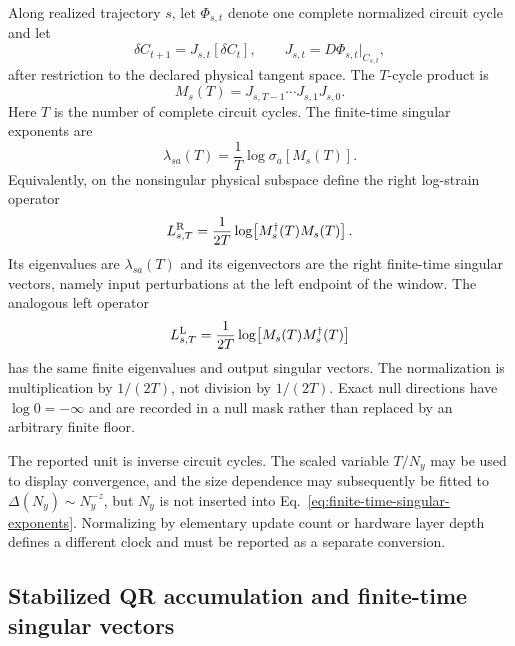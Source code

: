 \documentclass[aps,prx,twocolumn,floatfix,nofootinbib,superscriptaddress,longbibliography]{revtex4-2}
\begin{document}
Along realized trajectory $s$, let $\Phi_{s,t}$ denote one complete normalized circuit
cycle and let
\begin{equation}
 \delta C_{t+1}=J_{s,t}[\delta C_t],
 \qquad J_{s,t}=D\Phi_{s,t}\big|_{C_{s,t}},
 \label{eq:cycle-covariance-jacobian}
\end{equation}
after restriction to the declared physical tangent space.  The $T$-cycle product is
\begin{equation}
 M_s(T)=J_{s,T-1}\cdots J_{s,1}J_{s,0}.
 \label{eq:tangent-window-product}
\end{equation}
Here $T$ is the number of complete circuit cycles.  The finite-time singular exponents are
\begin{equation}
 \lambda_{sa}(T)=\frac1T\log\sigma_a[M_s(T)].
 \label{eq:finite-time-singular-exponents}
\end{equation}
Equivalently, on the nonsingular physical subspace define the right log-strain operator
\begin{equation}
 L_{s,T}^{\rm R}
 =\frac1{2T}\log\!\left[M_s^\dagger(T)M_s(T)\right].
 \label{eq:right-log-strain-operator}
\end{equation}
Its eigenvalues are $\lambda_{sa}(T)$ and its eigenvectors are the right finite-time
singular vectors, namely input perturbations at the left endpoint of the window.  The
analogous left operator
\begin{equation}
 L_{s,T}^{\rm L}
 =\frac1{2T}\log\!\left[M_s(T)M_s^\dagger(T)\right]
 \label{eq:left-log-strain-operator}
\end{equation}
has the same finite eigenvalues and output singular vectors.  The normalization is
multiplication by $1/(2T)$, not division by $1/(2T)$.  Exact null directions have
$\log0=-\infty$ and are recorded in a null mask rather than replaced by an arbitrary
finite floor.

The reported unit is inverse circuit cycles.  The scaled variable $T/N_y$ may be used to
display convergence, and the size dependence may subsequently be fitted to
$\Delta(N_y)\sim N_y^{-z}$, but $N_y$ is not inserted into
Eq.~\eqref{eq:finite-time-singular-exponents}.  Normalizing by elementary update count or
hardware layer depth defines a different clock and must be reported as a separate
conversion.

\subsection{Stabilized QR accumulation and finite-time singular vectors}
\end{document}
